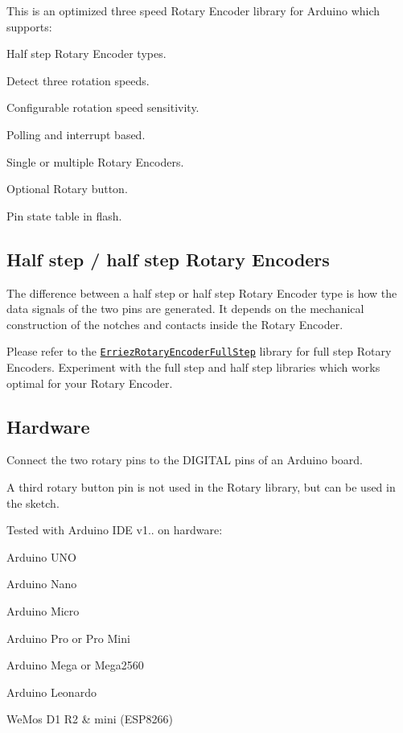\href{https://travis-ci.org/Erriez/ErriezRotaryEncoderHalfStep}{\tt }

This is an optimized three speed Rotary Encoder library for Arduino which supports\+:


\begin{DoxyItemize}
\item Half step Rotary Encoder types.
\item Detect three rotation speeds.
\item Configurable rotation speed sensitivity.
\item Polling and interrupt based.
\item Single or multiple Rotary Encoders.
\item Optional Rotary button.
\item Pin state table in flash.
\end{DoxyItemize}



\subsection*{Half step / half step Rotary Encoders}

The difference between a half step or half step Rotary Encoder type is how the data signals of the two pins are generated. It depends on the mechanical construction of the notches and contacts inside the Rotary Encoder.

Please refer to the \href{https://github.com/Erriez/ErriezRotaryEncoderFullStep}{\tt Erriez\+Rotary\+Encoder\+Full\+Step} library for full step Rotary Encoders. Experiment with the full step and half step libraries which works optimal for your Rotary Encoder.

\subsection*{Hardware}

Connect the two rotary pins to the D\+I\+G\+I\+T\+AL pins of an Arduino board.

A third rotary button pin is not used in the Rotary library, but can be used in the sketch.

Tested with Arduino I\+DE v1.. on hardware\+:


\begin{DoxyItemize}
\item Arduino U\+NO
\item Arduino Nano
\item Arduino Micro
\item Arduino Pro or Pro Mini
\item Arduino Mega or Mega2560
\item Arduino Leonardo
\item We\+Mos D1 R2 \& mini (E\+S\+P8266)
\end{DoxyItemize}

